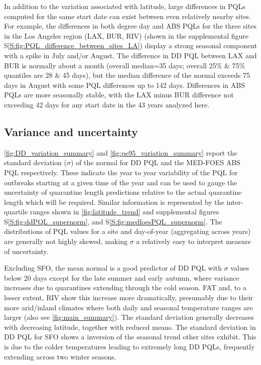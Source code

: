 \documentclass[10pt,a4paper,twocolumn]{article}
\begin{document}
In addition to the variation associated with latitude, 
large differences in PQLs computed for the same start date
can exist between even relatively nearby sites.
For example, the differences in both degree day and ABS PQLs 
for the three sites in the Los Angeles region (LAX, BUR, RIV) 
(shown in the supplemental figure S\ref{S:fig:PQL_difference_between_sites_LA})
display a strong seasonal component with a spike in July and/or August.
The difference in DD PQL between LAX and BUR is normally about a month
(overall median=35 days; overall 25\% \& 75\% quantiles are 28 \& 45 days), 
but the median difference of the normal exceeds 75 days in August with some 
PQL differences up to 142 days.
Differences in ABS PQLs are more seasonally stable, 
with the LAX minus BUR difference not exceeding 42 days
for any start date in the 43 years analyzed here.


\subsection*{Variance and uncertainty}

\autoref{fig:DD_variation_summary} and \autoref{fig:pe95_variation_summary}
report the standard deviation ($\sigma$) of the normal for DD PQL and the MED-FOES ABS PQL 
respectively.
These indicate the year to year variability of the PQL for outbreaks starting at a
given time of the year and can be used to gauge the uncertainty of quarantine 
length predictions relative to the actual quarantine length which will be required.
Similar information is represented by the inter-quartile ranges 
shown in \autoref{fig:latitude_trend} and supplemental figures
S\ref{S:fig:ddPQL_supernorm},
and S\ref{S:fig:medfoesPQL_supernorm}.
The distributions of PQL values for a site and day-of-year (aggregating across years) 
are generally not highly skewed, making $\sigma$ a relatively easy to interpret measure of uncertainty.

Excluding SFO, the mean normal is a good predictor of DD PQL with $\sigma$ values below 20 days
except for the late summer and early autumn, where variance increases 
due to quarantines extending through the cold season.
FAT and, to a lesser extent, RIV show this increase more dramatically, presumably due to their more 
arid/inland climates where both daily and seasonal temperature ranges are larger
(also see \autoref{fig:main_summary}).
The standard deviation generally decreases with decreasing latitude, together with reduced means.
The standard deviation in DD PQL for SFO shows a inversion of the seasonal trend 
other sites exhibit.
This is due to the colder temperatures leading to extremely long DD PQLs, 
frequently extending across two winter seasons.
\end{document}

